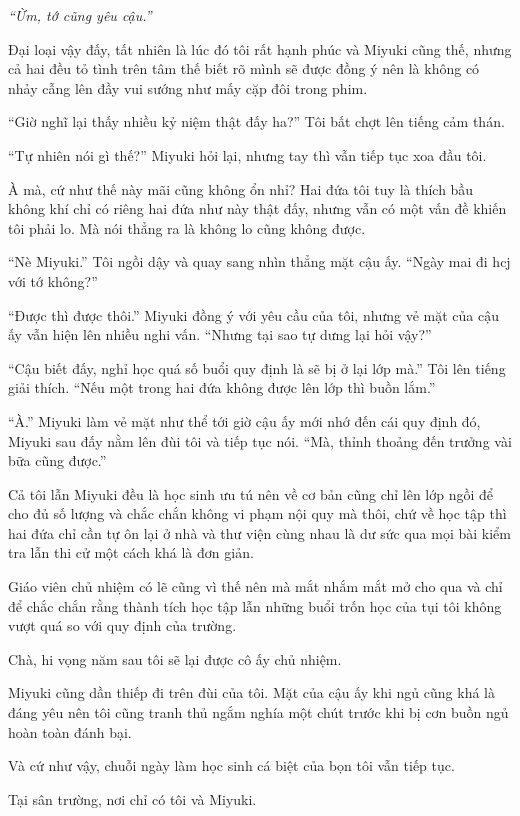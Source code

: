 {\emph{``Ừm, tớ cũng yêu cậu.''}

Đại loại vậy đấy, tất nhiên là lúc đó tôi rất hạnh phúc và Miyuki cũng
thế, nhưng cả hai đều tỏ tình trên tâm thế biết rõ mình sẽ được đồng ý
nên là không có nhảy cẫng lên đầy vui sướng như mấy cặp đôi trong phim.

``Giờ nghĩ lại thấy nhiều kỷ niệm thật đấy ha?'' Tôi bất chợt lên tiếng
cảm thán.

``Tự nhiên nói gì thế?'' Miyuki hỏi lại, nhưng tay thì vẫn tiếp tục xoa
đầu tôi.

À mà, cứ như thế này mãi cũng không ổn nhỉ? Hai đứa tôi tuy là thích bầu
không khí chỉ có riêng hai đứa như này thật đấy, nhưng vẫn có một vấn đề
khiến tôi phải lo. Mà nói thẳng ra là không lo cũng không được.

``Nè Miyuki.'' Tôi ngồi dậy và quay sang nhìn thẳng mặt cậu ấy. ``Ngày
mai đi hcj với tớ không?''

``Được thì được thôi.'' Miyuki đồng ý với yêu cầu của tôi, nhưng vẻ mặt
của cậu ấy vẫn hiện lên nhiều nghi vấn. ``Nhưng tại sao tự dưng lại hỏi
vậy?''

``Cậu biết đấy, nghỉ học quá số buổi quy định là sẽ bị ở lại lớp mà.''
Tôi lên tiếng giải thích. ``Nếu một trong hai đứa không được lên lớp thì
buồn lắm.''

``À.'' Miyuki làm vẻ mặt như thể tới giờ cậu ấy mới nhớ đến cái quy định
đó, Miyuki sau đấy nằm lên đùi tôi và tiếp tục nói. ``Mà, thỉnh thoảng
đến trưởng vài bữa cũng được.''

Cả tôi lẫn Miyuki đều là học sinh ưu tú nên về cơ bản cũng chỉ lên lớp
ngồi để cho đủ số lượng và chắc chắn không vi phạm nội quy mà thôi, chứ
về học tập thì hai đứa chỉ cần tự ôn lại ở nhà và thư viện cùng nhau là
dư sức qua mọi bài kiểm tra lẫn thi cử một cách khá là đơn giản.

Giáo viên chủ nhiệm có lẽ cũng vì thế nên mà mắt nhắm mắt mở cho qua và
chỉ để chắc chắn rằng thành tích học tập lẫn những buổi trốn học của tụi
tôi không vượt quá so với quy định của trường.

Chà, hi vọng năm sau tôi sẽ lại được cô ấy chủ nhiệm.

Miyuki cũng dần thiếp đi trên đùi của tôi. Mặt của cậu ấy khi ngủ cũng
khá là đáng yêu nên tôi cũng tranh thủ ngắm nghía một chút trước khi bị
cơn buồn ngủ hoàn toàn đánh bại.

Và cứ như vậy, chuỗi ngày làm học sinh cá biệt của bọn tôi vẫn tiếp tục.

Tại sân trường, nơi chỉ có tôi và Miyuki.
}